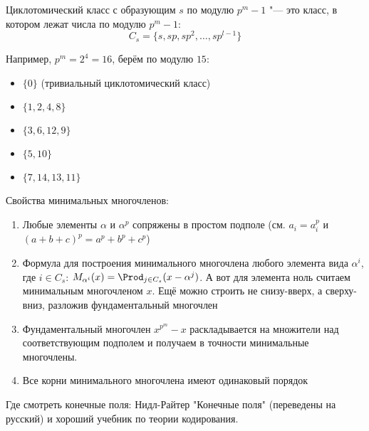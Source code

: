 \begin{Def}
Циклотомический класс с образующим $s$ по модулю $p^m-1$ "--- это
класс, в котором лежат числа по модулю $p^m-1$:
\[
C_s = \{s, sp, sp^2, \dots, sp^{l-1}\}
\]
\end{Def}
\begin{exmp}
Например, $p^m=2^4=16$, берём по модулю $15$:
\begin{itemize}
\item $\{0\}$ (тривиальный циклотомический класс)
\item $\{1,2,4,8\}$
\item $\{3,6,12,9\}$
\item $\{5,10\}$
\item $\{7,14,13,11\}$
\end{itemize}
\end{exmp}

\begin{Rem}
	Свойства минимальных многочленов:
	\begin{enumerate}
	\setcounter{enumerate}{5}
	\item Любые элементы $\alpha$ и $\alpha^p$ сопряжены в простом подполе
		(см. $a_i=a_i^p$ и $(a+b+c)^p=a^p+b^p+c^p$)
	\item Формула для построения минимального многочлена любого элемента
		вида $\alpha^i$, где $i \in C_s$:
		$M_{\alpha^i}(x) = \Prod_{j\in C_s} (x-\alpha^j)$.
		А вот для элемента ноль считаем минимальным многочленом $x$.
		Ещё можно строить не снизу-вверх, а сверху-вниз, разложив
		фундаментальный многочлен 
	\item Фундаментальный многочлен $x^{p^m}-x$ раскладывается
	    на множители над соответствующим подполем и получаем в точности
	    минимальные многочлены.
	\setcounter{enumerate}{10}
	\item Все корни минимального многочлена имеют одинаковый порядок
	\end{enumerate}
\end{Rem}

Где смотреть конечные поля: Нидл-Райтер "Конечные поля" (переведены на русский)
и хороший учебник по теории кодирования.
